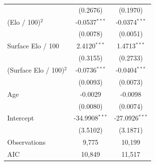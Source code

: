 \begin{tabular}{lcc}
 & (0.2676) & (0.1970) \\
(Elo / 100)$^2$ & -0.0537$^{***}$ & -0.0374$^{***}$ \\
 & (0.0078) & (0.0051) \\
Surface Elo / 100 & 2.4120$^{***}$ & 1.4713$^{***}$ \\
 & (0.3155) & (0.2733) \\
(Surface Elo / 100)$^2$ & -0.0736$^{***}$ & -0.0404$^{***}$ \\
 & (0.0093) & (0.0073) \\
Age & -0.0029 & -0.0098 \\
 & (0.0080) & (0.0074) \\
Intercept & -34.9908$^{***}$ & -27.0926$^{***}$ \\
 & (3.5102) & (3.1871) \\
\midrule
Observations & 9,775 & 10,199 \\
AIC & 10,849 & 11,517 \\
\bottomrule
\end{tabular}
